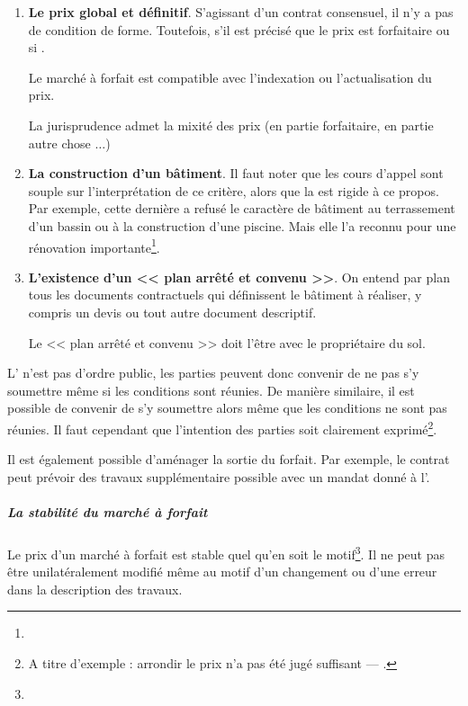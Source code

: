 					\begin{enumerate}
						\item \textbf{Le prix global et définitif}. S'agissant d'un contrat consensuel, il n'y a pas de condition de forme. Toutefois, s'il est précisé que le prix est forfaitaire ou si \lips.
						
						Le marché à forfait est compatible avec l'indexation ou l'actualisation du prix.
						
						La jurisprudence admet la mixité des prix (en partie forfaitaire, en partie autre chose $\dots$)
						
						\item \textbf{La construction d'un bâtiment}. Il faut noter que les cours d'appel sont souple sur l'interprétation de ce critère, alors que la \CourDeCas est rigide à ce propos.	Par exemple, cette dernière a refusé le caractère de bâtiment au terrassement d'un bassin ou à la construction d'une piscine. Mais elle l'a reconnu pour une rénovation importante\footnote{}. 
						
						\item \textbf{L'existence d'un << plan arrêté et convenu >>}. On entend par plan tous les documents contractuels qui définissent le bâtiment à réaliser, y compris un devis ou tout autre document descriptif.
						
						Le << plan arrêté et convenu >> doit l'être avec le propriétaire du sol.
					\end{enumerate}
					
					L' n'est pas d'ordre public, les parties peuvent donc convenir de ne pas s'y soumettre même si les conditions sont réunies. De manière similaire, il est possible de convenir de s'y soumettre alors même que les conditions ne sont pas réunies. Il faut cependant que l'intention des parties soit clairement exprimé\footnote{A titre d'exemple : arrondir le prix n'a pas été jugé suffisant --- .}.
					
					Il est également possible d'aménager la sortie du forfait. Par exemple, le contrat peut prévoir des travaux supplémentaire possible avec un mandat donné à l'\archi.
					
					\subparagraph{La stabilité du marché à forfait\\}
					
					Le prix d'un marché à forfait est stable quel qu'en soit le motif\footnote{}. Il ne peut pas être unilatéralement modifié même au motif d'un changement ou d'une erreur dans la description des travaux.
					
